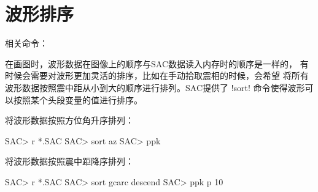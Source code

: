 \section{波形排序}
相关命令：

在画图时，波形数据在图像上的顺序与SAC数据读入内存时的顺序是一样的，
有时候会需要对波形更加灵活的排序，比如在手动拾取震相的时候，会希望
将所有波形数据按照震中距从小到大的顺序进行排列。SAC提供了 !sort!
命令使得波形可以按照某个头段变量的值进行排序。

将波形数据按照方位角升序排列：
\begin{SACCode}
SAC> r *.SAC
SAC> sort az
SAC> ppk
\end{SACCode}

将波形数据按照震中距降序排列：
\begin{SACCode}
SAC> r *.SAC
SAC> sort gcarc descend
SAC> ppk p 10
\end{SACCode}
